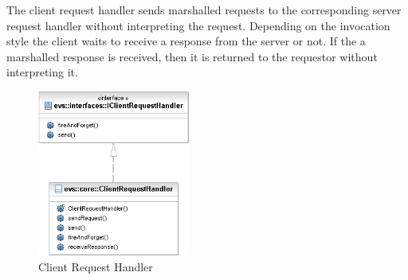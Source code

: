 The client request handler sends marshalled requests to the corresponding server request handler without interpreting the request.
Depending on the invocation style the client waits to receive a response from the server or not.
If the a marshalled response is received, then it is returned to the requestor without interpreting it.

\begin{figure}[ht!]
	\centering\includegraphics[width=5cm]{uml/ClientRequestHandler.jpg} 
	\caption{Client Request Handler}
	\label{fig:clientrequesthandler}
\end{figure}

